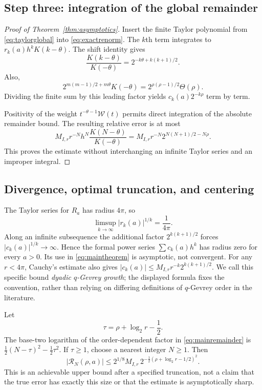 \documentclass[11pt,letterpaper]{article}
\numberwithin{equation}{section}
\theoremstyle{definition}
\theoremstyle{remark}
\newcommand{\W}{\mathcal W}
\begin{document}
\subsection{Step three: integration of the global remainder}
\begin{proof}[Proof of Theorem~\ref{thm:asymptotics}]
Insert the finite Taylor polynomial from \eqref{eq:taylorglobal} into
\eqref{eq:exactrenorm}. The $k$th term integrates to
$r_k(a)h^kK(k-\theta)$.
The shift identity gives
\begin{equation}\label{eq:momentratio}
 \frac{K(k-\theta)}{K(-\theta)}
   =2^{-k\theta+k(k+1)/2}.
\end{equation}
Also,
\begin{equation}\label{eq:leadingfactor}
 2^{m(m-1)/2+m\theta}K(-\theta)
   =2^{\rho(\rho-1)/2}\Theta(\rho).
\end{equation}
Dividing the finite sum by this leading factor yields
$c_k(a)2^{-k\rho}$ term by term.

Positivity of the weight $t^{-\theta-1}\W(t)$ permits direct integration
of the absolute remainder bound. The resulting relative error is at most
\[
 M_{I,r}r^{-N}h^N\frac{K(N-\theta)}{K(-\theta)}
 =M_{I,r}r^{-N}2^{N(N+1)/2-N\rho}.
\]
This proves the estimate without interchanging an infinite Taylor series
and an improper integral.
\end{proof}

\subsection{Divergence, optimal truncation, and centering}
The Taylor series for $R_a$ has radius $4\pi$, so
\begin{equation}\label{eq:rlimsup}
 \limsup_{k\to\infty}|r_k(a)|^{1/k}=\frac1{4\pi}.
\end{equation}
Along an infinite subsequence the additional factor
$2^{k(k+1)/2}$ forces $|c_k(a)|^{1/k}\to\infty$.
Hence the formal power series $\sum c_k(a)h^k$ has radius zero for every
$a>0$. Its use in \eqref{eq:maintheorem} is asymptotic, not convergent.
For any $r<4\pi$, Cauchy's estimate also gives
$|c_k(a)|\le M_{I,r}r^{-k}2^{k(k+1)/2}$.
We call this specific bound \emph{dyadic $q$-Gevrey growth}; the displayed
formula fixes the convention, rather than relying on differing definitions
of $q$-Gevrey order in the literature.

Let
\begin{equation}\label{eq:tau}
 \tau=\rho+\log_2r-\frac12.
\end{equation}
The base-two logarithm of the order-dependent factor in
\eqref{eq:mainremainder} is
$\frac12(N-\tau)^2-\frac12\tau^2$.
If $\tau\ge1$, choose a nearest integer $N\ge1$. Then
\begin{equation}\label{eq:optimal}
 |\mathcal R_N(\rho,a)|
 \le 2^{1/8}M_{I,r}\,2^{-\frac12(\rho+\log_2r-1/2)^2}.
\end{equation}
This is an achievable upper bound after a specified truncation, not a
claim that the true error has exactly this size or that the estimate is
asymptotically sharp.
\end{document}
